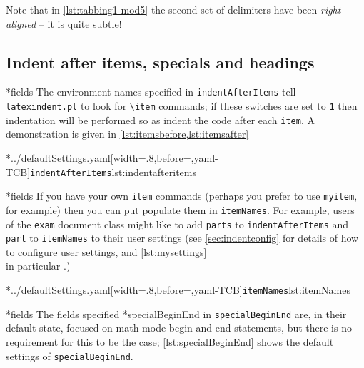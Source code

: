 	Note that in \cref{lst:tabbing1-mod5} the second set of delimiters have been
	\emph{right aligned} -- it is quite subtle!

\subsection{Indent after items, specials and headings}
*{fields}
	The environment names specified in \texttt{indentAfterItems} tell \texttt{latexindent.pl}
	to look for \lstinline!\item! commands; if these switches are set to
	\texttt{1} then indentation will be performed so as indent the code after
	each \texttt{item}. A demonstration is given in \cref{lst:itemsbefore,lst:itemsafter}

	\begin{cmhtcbraster}[raster columns=3,
			raster left skip=-3.5cm,
			raster right skip=-2cm,
			raster column skip=.03\linewidth]
		\cmhlistingsfromfile[style=indentAfterItems]*{../defaultSettings.yaml}[width=.8\linewidth,before=\centering,yaml-TCB]{\texttt{indentAfterItems}}{lst:indentafteritems}
	\end{cmhtcbraster}

*{fields}
	If you have your own \texttt{item} commands (perhaps you prefer to use
	\texttt{myitem}, for example) then you can put populate them in
	\texttt{itemNames}. For example, users of the \texttt{exam} document class
	might like to add \texttt{parts} to \texttt{indentAfterItems} and
	\texttt{part} to \texttt{itemNames} to their user settings (see
	\vref{sec:indentconfig} for details of how to configure user settings, and
	\vref{lst:mysettings} \\ in particular \label{page:examsettings}.)

	\cmhlistingsfromfile[style=itemNames]*{../defaultSettings.yaml}[width=.8\linewidth,before=\centering,yaml-TCB]{\texttt{itemNames}}{lst:itemNames}

*{fields}\label{yaml:specialBeginEnd}
	The fields specified
	*{specialBeginEnd} in
	\texttt{specialBeginEnd} are, in their default state, focused on math mode begin and end
	statements, but there is no requirement for this to be the case; \cref{lst:specialBeginEnd}
	shows the default settings of \texttt{specialBeginEnd}.


